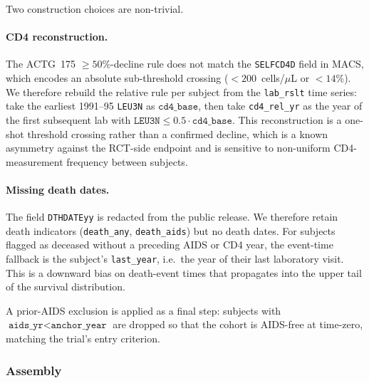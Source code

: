 \documentclass[11pt]{article}
\theoremstyle{plain}
\theoremstyle{definition}
\theoremstyle{remark}
\newcommand{\1}{\mathds{1}}
\begin{document}
Two construction choices are non-trivial.

\paragraph{CD4 reconstruction.} The ACTG~175 $\geq 50\%$-decline rule
does not match the \texttt{SELFCD4D} field in MACS, which encodes an
absolute sub-threshold crossing ($< 200$~cells/$\mu$L or $< 14\%$). We
therefore rebuild the relative rule per subject from the
\texttt{lab\_rslt} time series: take the earliest 1991--95 \texttt{LEU3N}
as $\texttt{cd4\_base}$, then take \texttt{cd4\_rel\_yr} as the year of
the first subsequent lab with $\texttt{LEU3N} \leq 0.5 \cdot
\texttt{cd4\_base}$. This reconstruction is a one-shot threshold
crossing rather than a confirmed decline, which is a known asymmetry
against the RCT-side endpoint and is sensitive to non-uniform
CD4-measurement frequency between subjects.

\paragraph{Missing death dates.} The field \texttt{DTHDATEyy} is redacted
from the public release. We therefore retain death indicators
(\texttt{death\_any}, \texttt{death\_aids}) but no death dates. For
subjects flagged as deceased without a preceding AIDS or CD4 year, the
event-time fallback is the subject's \texttt{last\_year}, i.e.\ the year
of their last laboratory visit. This is a downward bias on death-event
times that propagates into the upper tail of the survival distribution.

A prior-AIDS exclusion is applied as a final step: subjects with
$\texttt{aids\_yr} < \texttt{anchor\_year}$ are dropped so that the
cohort is AIDS-free at time-zero, matching the trial's entry criterion.

\subsubsection*{Assembly}
\end{document}
